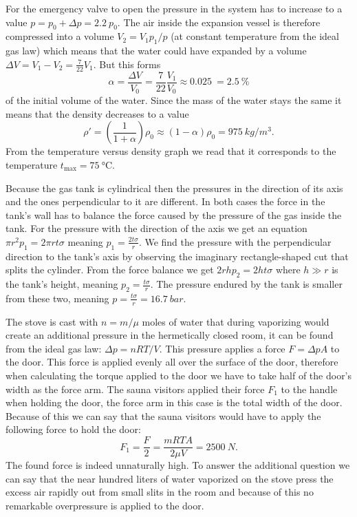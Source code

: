 \documentclass[11pt]{article}
\begin{document}

\solueng
For the emergency valve to open the pressure in the system has to increase to a value $p=p_0+\Delta p = \SI{2.2}{}p_0$. The air inside the expansion vessel is therefore compressed into a volume $V_2=V_1 p_1/p$ (at constant temperature from the ideal gas law) which means that the water could have expanded by a volume $\Delta V = V_1-V_2 = \frac{7}{22}V_1$. But this forms
\[\alpha = \frac{\Delta V}{V_0}= \frac{7}{22}\frac{V_1}{V_0}\approx \SI{0.025}{} =  \SI{2.5}{}\%\] 
of the initial volume of the water.  Since the mass of the water stays the same it means that the density decreases to a value
\[\rho'=\left(\frac{1}{1+\alpha}\right)\rho_0\approx(1-\alpha)\rho_0= \SI{975}{kg/m^3}.\] 
From the temperature versus density graph we read that it corresponds to the temperature $t_\text{max}=\SI{75}{\degreeCelsius}$.
\probend
\bigskip


\solueng
Because the gas tank is cylindrical then the pressures in the direction of its axis and the ones perpendicular to it are different. In both cases the force in the tank’s wall has to balance the force caused by the pressure of the gas inside the tank. For the pressure with the direction of the axis we get an equation $\pi r^2 p_1=2\pi rt\sigma$ meaning $p_1=\frac{2t\sigma}{r}$. We find the pressure with the perpendicular direction to the tank’s axis by observing the imaginary rectangle-shaped cut that splits the cylinder. From the force balance we get $2rhp_2=2ht\sigma$ where $h\gg r$ is the tank’s height, meaning $p_2=\frac{t\sigma}{r}$. The pressure endured by the tank is smaller from these two, meaning $p=\frac{t\sigma}{r}=\SI{16,7}{bar}$.
\probend
\bigskip


\solueng
The stove is cast with $n=m/\mu$ moles of water that during vaporizing would create an additional pressure in the hermetically closed room, it can be found from the ideal gas law: $\Delta p = nRT/V$. This pressure applies a force $F=\Delta p A$ to the door. This force is applied evenly all over the surface of the door, therefore when calculating the torque applied to the door we have to take half of the door’s width as the force arm. The sauna visitors applied their force $F_1$ to the handle when holding the door, the force arm in this case is the total width of the door. Because of this we can say that the sauna visitors would have to apply the following force to hold the door:
\[F_1 = \frac{F}{2} = \frac{mRTA}{2 \mu V} = \SI{2500}{N}.\] 
The found force is indeed unnaturally high. To answer the additional question we can say that the near hundred liters of water vaporized on the stove press the excess air rapidly out from small slits in the room and because of this no remarkable overpressure is applied to the door.
\probend
\bigskip
\end{document}
